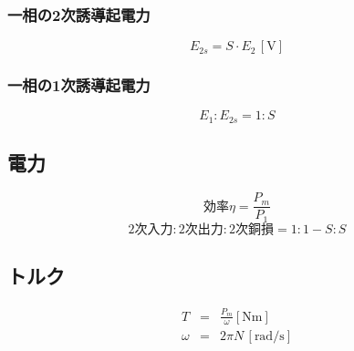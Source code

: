 \subsubsection{一相の2次誘導起電力}
\begin{equation}
  E_{2s} = S \cdot E_2\, [\textrm{V}]
\end{equation}

\subsubsection{一相の1次誘導起電力}
\begin{equation}
  E_1 : E_{2s} = 1 : S
\end{equation}

\subsection{電力}
\begin{equation}
  \mbox{効率} \eta = \frac{P_m}{P_1}
\end{equation}
\begin{equation}
  \mbox{2次入力} : \mbox{2次出力} : \mbox{2次銅損} = 1: 1-S : S
\end{equation}

\subsection{トルク}
\begin{eqnarray}
  T &=& \frac{P_m}{\omega} [\textrm{Nm}]\\
  \omega &=& 2 \pi N \, [\textrm{rad/s}]
\end{eqnarray}
